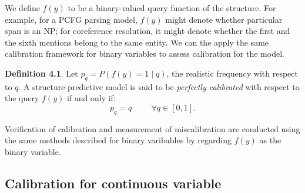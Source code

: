 We define $f(y)$ to be a binary-valued query function of the structure. For example, for a PCFG parsing model, $f(y)$ might denote whether particular span is an NP; for coreference resolution, it might denote whether the first and the sixth mentions belong to the same entity. We can the apply the same calibration framework for binary variables to assess calibration for the model. 

\textbf{Definition 4.1}. Let $p_q = P(f(y) = 1 \mid q)$, the realistic frequency with respect to $q$. A structure-predictive model is said to be \textit{perfectly calibrated} with respect to the query $f(y)$ if and only if:
$$p_q = q \hspace{1cm} \forall q \in [0, 1].$$  

Verification of calibration and measurement of miscalibration are conducted using the same methods described for binary varibables by regarding $f(y)$ as the binary variable. 

\subsection{Calibration for continuous variable}


